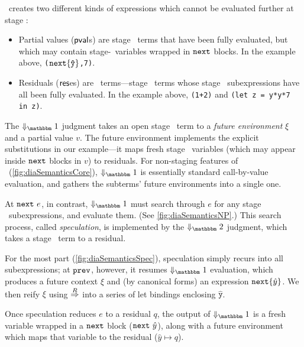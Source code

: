 \lang\ creates two different kinds of expressions which
cannot be evaluated further at stage \bbone:
\begin{itemize}
\item Partial values ($\mathsf{pval}$s) are stage \bbone\ terms that have been fully
evaluated, but which may contain stage-\bbtwo\ variables wrapped in ${\tt next}$
blocks.  In the example above, 
\verb|(|${\tt next} \{\mathtt{\hat y}\}$\verb|,7)|.

\item Residuals ($\mathsf{res}$es) are \langTwo\ terms---stage \bbtwo\ terms whose
stage \bbone\ subexpressions have all been fully evaluated. In the example
above,
\verb|(1+2)| and \verb|(let z = y*y*7 in z)|.

\end{itemize}


The $\redonesym$ judgment takes an open stage \bbone\ term to a {\em future
environment} $\xi$ and a partial value $v$.  The future environment implements
the explicit substitutions in our example---it maps fresh stage \bbtwo\
variables (which may appear inside ${\tt next}$ blocks in $v$) to
residuals. For non-staging features of \lang\ (\ref{fig:diaSemanticsCore}),
$\redonesym$ is essentially standard call-by-value evaluation, and gathers the
subterms' future environments into a single one.


At ${\tt next}~e$, in contrast, $\redonesym$ must search through $e$ for any stage
\bbone\ subexpressions, and evaluate them.  (See \ref{fig:diaSemanticsNP}.)
This search process, called \emph{speculation}, is implemented by the
$\redtwosym$ judgment, which takes a stage \bbtwo\ term to a residual. 

For the most part (\ref{fig:diaSemanticsSpec}), speculation simply recurs into
all subexpressions; at ${\tt prev}$, however, it resumes $\redonesym$ evaluation,
which produces a future context $\xi$ and (by canonical forms) an expression
${\tt next}\{\hat y\}$. We then reify $\xi$ using $\overset{R}\Rightarrow$ into a series of let
bindings enclosing $\mathtt{\hat y}$.

Once speculation reduces $e$ to a residual $q$, the output of $\redonesym$ is a
fresh variable wrapped in a ${\tt next}$ block (${\tt next}~\hat y$), along with a future
environment which maps that variable to the residual ($\hat y \mapsto q$).

